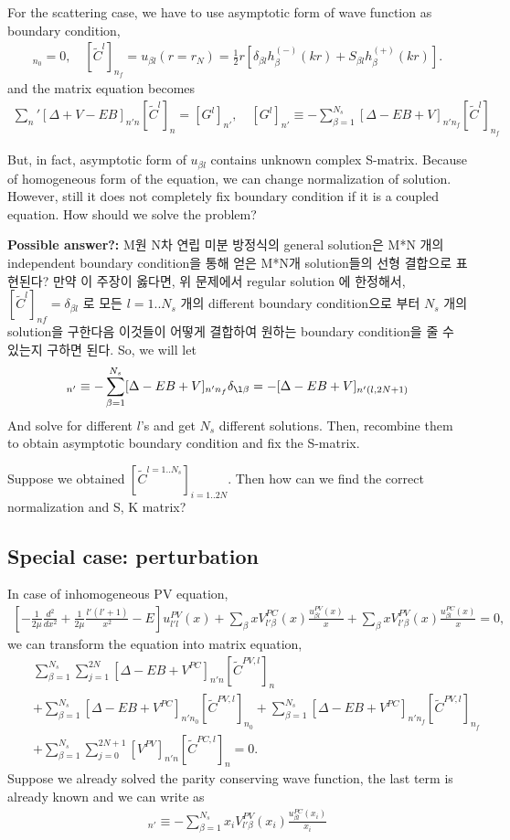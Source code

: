 \documentclass[10pt]{article}
\newcommand{\bea}{\begin{eqnarray}}
\newcommand{\eea}{\end{eqnarray}}
\newcommand{\no}{\nonumber \\}
\begin{document}
For the scattering case, we have to use asymptotic form of wave function as boundary 
condition,
\bea 
[\tilde{C}^l]_{n_0}=0,\quad 
[\tilde{C}^l]_{n_f}= u_{\beta l}(r=r_N)
                   =\frac{1}{2}r[\delta_{\beta l} h_{\beta}^{(-)}(kr)
                                 +S_{\beta l} h_{\beta}^{(+)}(kr)]   
.
\eea 
and the matrix equation becomes
\bea 
{\sum_{n}}'[\Delta+V-E B]_{n'n}[\tilde{C}^l]_{n}
=[ G^l ]_{n'},
\quad [G^l]_{n'}\equiv -\sum_{\beta=1}^{N_{s}}[\Delta -E B +V]_{n'n_f}[\tilde{C}^l]_{n_f}
\eea 

But, in fact, asymptotic form of $u_{\beta l}$ contains unknown 
complex S-matrix. Because of homogeneous form of the equation, 
we can change normalization of solution. 
However, still it does not completely fix boundary condition if it is a coupled equation.
How should we solve the problem? 

{\bf Possible answer?:} M원 N차 연립 미분 방정식의 general solution은 
M*N 개의 independent boundary condition을 통해 얻은 M*N개 
solution들의 선형 결합으로 표현된다? 만약 이 주장이 옳다면, 위 문제에서 
regular solution 에 한정해서, $[\tilde{C}^l]_{nf}=\delta_{\beta l}$ 
로 모든 $l=1..N_s$ 개의 different boundary condition으로 부터  
$N_s$ 개의 solution을 구한다음 이것들이 어떻게 결합하여 원하는 boundary condition을 줄 수 있는지
구하면 된다. So, we will let 
\bea 
[G^l]_{n'}\equiv -\sum_{\beta=1}^{N_{s}}[\Delta -E B +V]_{n'n_f} \delta_{\l \beta}
             = -[\Delta -E B +V]_{n'(l,2N+1)}
\eea 
And solve for different $l$'s and get $N_s$ different solutions. Then, 
recombine them to obtain asymptotic boundary condition and fix the S-matrix. 

Suppose we obtained $[\tilde{C}^{l=1..N_s}]_{i=1..2N}$. Then how can we find the
correct normalization and S, K matrix?


\subsection{Special case: perturbation}
In case of inhomogeneous PV equation, 
\bea 
\left[ -\frac{1}{2\mu}\frac{d^2}{dx^2}+\frac{1}{2\mu}\frac{l'(l'+1)}{x^2}-E\right] 
u^{PV}_{l' l}(x)+\sum_{\beta} x V^{PC}_{l'\beta}(x) \frac{u^{PV}_{\beta l}(x)}{x}
+\sum_{\beta} x V^{PV}_{l'\beta}(x) \frac{u^{PC}_{\beta l}(x)}{x}
 =0,
\eea
we can transform the equation into matrix equation,
\bea 
& &\sum_{\beta=1}^{N_{s}}\sum_{j=1}^{2N}[\Delta -E B +V^{PC}]_{n'n}[\tilde{C}^{PV,l}]_n \no 
& &+\sum_{\beta=1}^{N_{s}}[\Delta -E B +V^{PC}]_{n'n_0}[\tilde{C}^{PV,l}]_{n_0}
+\sum_{\beta=1}^{N_{s}}[\Delta -E B +V^{PC}]_{n'n_f}[\tilde{C}^{PV,l}]_{n_f} \no 
& &+\sum_{\beta=1}^{N_s}\sum_{j=0}^{2N+1}[V^{PV}]_{n'n}[\tilde{C}^{PC,l}]_{n} 
=0.
\eea  
Suppose we already solved the parity conserving wave function, 
the last term is already known and we can write as
\bea 
[K^l]_{n'} \equiv -\sum_{\beta=1}^{N_s} x_i V^{PV}_{l'\beta}(x_i) \frac{u^{PC}_{\beta l}(x_i)}{x_i}
\eea 
\end{document}
